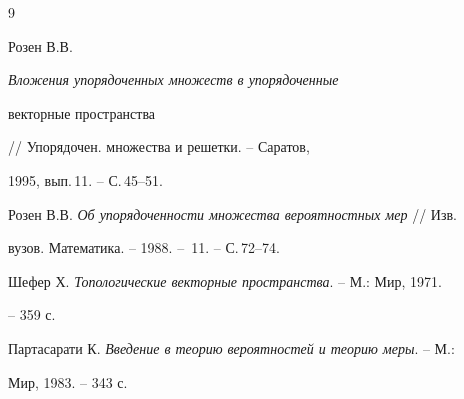 

 


\begin{thebibliography}{9} 


 




Розен В.В. {\em Вложения упорядоченных множеств в упорядоченные 


векторные пространства} // Упорядочен. множества и решетки. -- Саратов, 


1995, вып.\,11. -- С.\,45--51. 




Розен В.В. {\em Об упорядоченности множества вероятностных мер} // Изв. 


вузов. Математика. -- 1988. -- \No\,11. -- С.\,72--74. 




Шефер Х. {\em Топологические векторные пространства}. -- М.: Мир, 1971. 


-- 359 с. 




Партасарати К. {\em Введение в теорию вероятностей и теорию меры}. -- М.: 


Мир, 1983. -- 343 с. 


 


 


\end{thebibliography} 


 


\vskip 2cm 


 






 


\label{end} 


 


